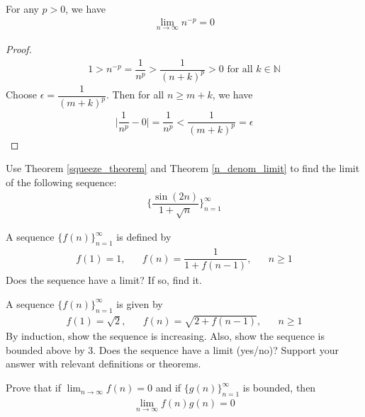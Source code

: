 \begin{theorem}
For any $p > 0$, we have
\begin{align*}
    \lim_{n \longrightarrow \infty} n^{-p} = 0
\end{align*}
\begin{proof}
\begin{align*}
    1 > n^{-p} = \dfrac{1}{n^{p}} > \dfrac{1}{(n+k)^{p}} > 0 \hspace{4pt} \text{for all} \hspace{4pt} k \in \mathbb{N}
\end{align*}
Choose $\epsilon = \dfrac{1}{(m+k)^p}$. Then for all $n \geq m+k$, we have
\begin{align*}
    \Big\lvert \dfrac{1}{n^{p}} - 0 \Big\rvert = \dfrac{1}{n^{p}} < \dfrac{1}{(m + k)^{p}} = \epsilon
\end{align*}
\end{proof}
\label{n_denom_limit}
\end{theorem}

\begin{exercise}
Use Theorem \ref{squeeze_theorem} and Theorem \ref{n_denom_limit} to find the limit of the following sequence:
\begin{align*}
    \Big\{\dfrac{\sin(2n)}{1+\sqrt{n}}\Big\}_{n=1}^{\infty}
\end{align*}
\end{exercise}

\begin{exercise}
A sequence $\{f(n)\}_{n=1}^{\infty}$ is defined by 
\begin{align*}
    f(1) = 1, \hspace{20pt} f(n) = \dfrac{1}{1+f(n-1)}, \hspace{20pt} n \geq 1
\end{align*}
Does the sequence have a limit? If so, find it.
\end{exercise}

\begin{exercise}
A sequence $\{f(n)\}_{n=1}^{\infty}$ is given by 
\begin{align*}
    f(1) = \sqrt{2}, \hspace{20pt} f(n) = \sqrt{2 + f(n-1)}, \hspace{20pt} n \geq 1
\end{align*}
By induction, show the sequence is increasing. Also, show the sequence is bounded above by $3$. Does the sequence have a limit (yes/no)? Support your answer with relevant definitions or theorems.
\end{exercise}

\begin{exercise}
Prove that if $\lim_{n \longrightarrow \infty} f(n) = 0$ and if $\{g(n)\}_{n=1}^{\infty}$ is bounded, then 
\begin{align*}
    \lim_{n \longrightarrow \infty} f(n)g(n) = 0
\end{align*}
\end{exercise}
